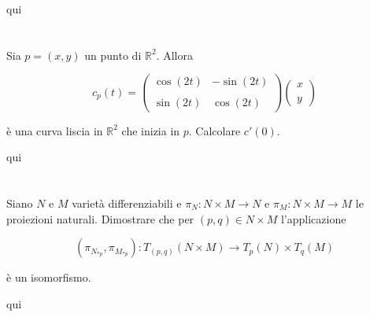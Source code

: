 qui

\tocless\section{}\label{es2-10}

\begin{tcolorbox}
	Sia $ p = (x,y) $ un punto di $ \mathbb{R}^{2} $. Allora
	
	\begin{equation}
		c_{p}(t) = \begin{pmatrix} \cos(2t) & -\sin(2t) \\\\ \sin(2t) & \cos(2t) \end{pmatrix} \begin{pmatrix} x \\\\ y \end{pmatrix}
	\end{equation}
	
	è una curva liscia in $ \mathbb{R}^{2} $ che inizia in $ p $. Calcolare $ c'(0) $.
\end{tcolorbox}

qui

\tocless\section{}\label{es2-11}

\begin{tcolorbox}
	Siano $ N $ e $ M $ varietà differenziabili e $ \pi_{N} : N \times M \to N $ e $ \pi_{M} : N \times M \to M $ le proiezioni naturali. Dimostrare che per $ (p,q) \in N \times M $ l'applicazione
	
	\begin{equation}
		(\pi_{N_{*p}},\pi_{M_{*p}}) : T_{(p,q)}(N \times M) \to T_{p}(N) \times T_{q}(M)
	\end{equation}
	
	è un isomorfismo.
\end{tcolorbox}

qui




\tocless\section{}\label{es2-12}

